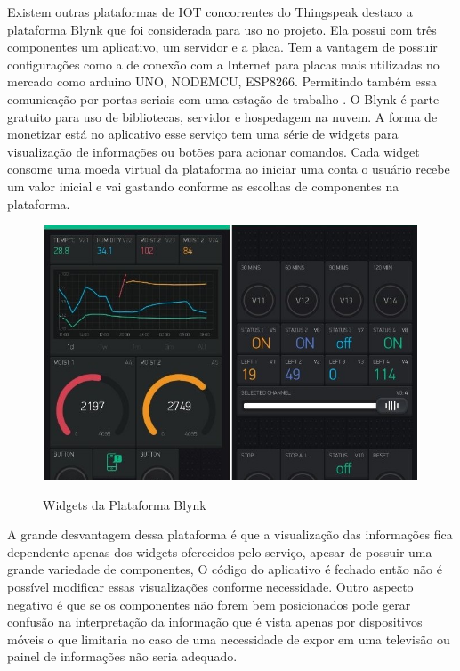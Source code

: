 Existem outras plataformas de IOT concorrentes do Thingspeak destaco a plataforma Blynk que foi considerada para uso no projeto. Ela possui com três componentes um aplicativo, um servidor e a placa. Tem a vantagem de possuir configurações como a de conexão com a Internet para placas mais utilizadas no mercado como arduino UNO, NODEMCU, ESP8266. Permitindo também essa comunicação por portas seriais com uma estação de trabalho \cite{8473224}. O Blynk é parte gratuito para uso de bibliotecas, servidor e hospedagem na nuvem. A forma de monetizar está no aplicativo esse serviço tem uma série de widgets para visualização de informações ou botões para acionar comandos. Cada widget consome uma moeda virtual da plataforma ao iniciar uma conta o usuário recebe um valor inicial e vai gastando conforme as escolhas de componentes na plataforma.

\begin{figure}[h!]
    \centering
    \caption{Widgets da Plataforma Blynk}
    \includegraphics[scale=0.5]{Figuras/blynk_app.jpg}
    \label{fig:blynk}
\end{figure}

A grande desvantagem dessa plataforma é que a visualização das informações fica dependente apenas dos widgets oferecidos pelo serviço, apesar de possuir uma grande variedade de componentes, O código do aplicativo é fechado então não é possível modificar essas visualizações conforme necessidade. Outro aspecto negativo é que se os componentes não forem bem posicionados pode gerar confusão na interpretação da informação que é vista apenas por dispositivos móveis o que limitaria no caso de uma necessidade de expor em uma televisão ou painel de informações não seria adequado.

